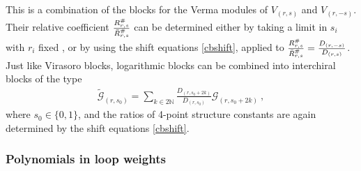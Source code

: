 \documentclass[12pt, a4paper]{article}
\theoremstyle{break}
\begin{document}
This is a combination of the blocks for the Verma modules of $V_{(r,s)}$ and $V_{(r,-s)}$. Their relative coefficient $\frac{R^{\#}_{r,s}}{\vphantom{\tilde{|}}\bar{R}^{\#}_{r,s}}$ can be determined either by taking a limit in $s_i$ with $r_i$ fixed \cite{gnjrs21}, or by using the shift equations \eqref{cbshift}, applied to $\frac{R^{\#}_{r,s}}{\vphantom{\tilde{|}}\bar{R}^{\#}_{r,s}} = \frac{D_{(r,-s)}}{D_{(r,s)}}$. 
Just like Virasoro blocks, logarithmic blocks can be combined into interchiral blocks of the type 
\begin{align}
 \widetilde{\mathcal{G}}_{(r,s_0)} = \sum_{k\in 2\mathbb{N}} \frac{D_{(r,s_0+2k)}}{D_{(r,s_0)}} \mathcal{G}_{(r,s_0+2k)}\ , 
\end{align}
where $s_0\in \{0,1\}$, and the ratios of 4-point structure constants are again determined by the shift equations \eqref{cbshift}. 

\subsubsection{Polynomials in loop weights}\label{sec:plw}
\end{document}
